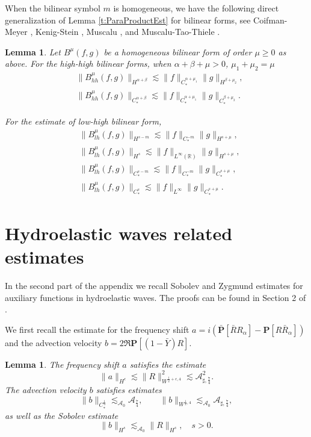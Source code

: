 \documentclass[10pt]{amsart}
\newtheorem{lemma}[theorem]{Lemma}
\theoremstyle{remark}
\theoremstyle{definition}
\numberwithin{equation}{section}
\newcommand{\f}{\frac}
\newcommand{\nP}{{\mathbf P}}
\newcommand{\CalAZ}{{\mathcal{A}_0}}
\newcommand{\ASSharp}{{\mathcal{A}_{\sharp,\frac{7}{4}}^2}}
\begin{document}
When the bilinear symbol $m$  is homogeneous, we have the following direct generalization of Lemma \ref{t:ParaProductEst} for bilinear forms, see Coifman-Meyer \cite{MR0518170}, Kenig-Stein \cite{MR1682725},  Muscalu \cite{MR2371442}, and Muscalu-Tao-Thiele \cite{MR1887641}.
\begin{lemma} \label{t:BMuBound}
Let $B^\mu(f,g)$ be a homogeneous  bilinear form of order $\mu\geq 0$ as above. 
For the high-high bilinear forms, when $\alpha+\beta+\mu>0$, $\mu_1 + \mu_2 = \mu$
\begin{align}
&\|B^\mu_{hh}(f, g)\|_{H^{\alpha + \beta}} \lesssim \| f\|_{C_{*}^{\alpha + \mu_1}} \| g\|_{H^{\beta + \mu_2}}, \label{HHBilinearHCH}\\
& \|B^\mu_{hh}(f, g)\|_{C_{*}^{\alpha + \beta}} \lesssim \| f\|_{C_{*}^{\alpha+\mu_1}} \| g\|_{C_{*}^{\beta+\mu_2}}.  \label{HHBilinearCCC}
\end{align}

For the estimate of low-high bilinear form,
\begin{align}
&\|B^\mu_{lh}(f, g) \|_{H^{s-m}} \lesssim \|f\|_{C_{*}^{-m}} \| g \|_{H^{s+\mu}} \label{BFHsCmStar}, \\
&\|B^\mu_{lh}(f, g) \|_{H^{s}} \lesssim \|f\|_{L^\infty(\mathbb{R})} \| g \|_{H^{s+\mu}}, \label{BFHsLinfty}\\
&\|B^\mu_{lh}(f, g) \|_{C_{*}^{s-m}} \lesssim \|f\|_{C_{*}^{-m}} \| g \|_{C_{*}^{s+\mu}}, \label{BFCsCmStar}\\
&\|B^\mu_{lh}(f, g) \|_{C_{*}^{s}} \lesssim \|f\|_{L^\infty} \| g \|_{C_{*}^{s+\mu}}. \label{BFCsLInfty}     
\end{align}
\end{lemma}



\section{Hydroelastic waves related estimates} \label{s:HydroWaveEst}
In the second part of the appendix we recall Sobolev and Zygmund estimates for auxiliary functions in hydroelastic waves.
The proofs can be found in Section 2 of \cite{wan2024}.

We first recall the estimate for the frequency shift $a = i\left(\bar \nP [\bar{R} R_\alpha]- \nP[R\bar{R}_\alpha]\right)$ and the advection velocity $b = 2\Re \nP[(1-\bar{Y})R]$.
\begin{lemma}
The frequency shift $a$ satisfies the estimate
\begin{equation} \label{aEst}
 \|a\|_{H^\epsilon} \lesssim \|R \|^2_{W^{\frac{1}{2}+\epsilon, 4}} \lesssim \ASSharp.  
\end{equation}
The advection velocity $b$ satisfies estimates
\begin{equation} \label{BCOneStar}
\| b\|_{C^{\f14}_{*}} \lesssim_\CalAZ \mathcal{A}_{\f74},  \quad \quad
\|b\|_{W^{\f12,4}} \lesssim_{\CalAZ} \mathcal{A}_{\sharp, \f74},
\end{equation}
as well as the Sobolev estimate
\begin{equation} \label{BHsEst}
\| b\|_{H^s}  \lesssim_{\CalAZ} \|R\|_{H^{s}}, \quad s>0.
\end{equation}
\end{lemma}
\end{document}
